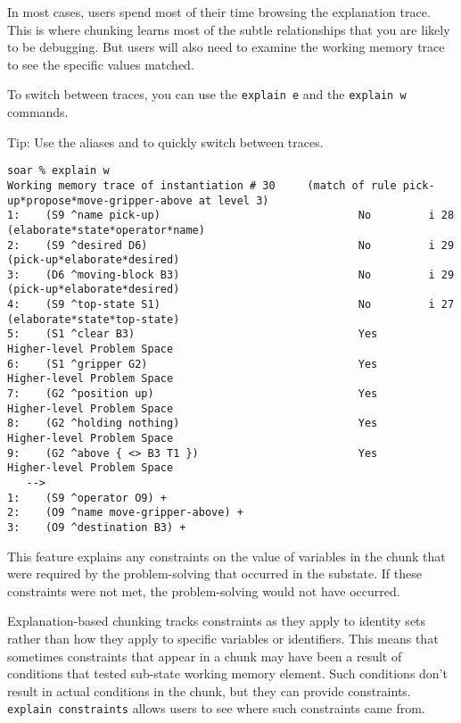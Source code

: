 \textbf{}

In most cases, users spend most of their time browsing the explanation
trace. This is where chunking learns most of the subtle relationships
that you are likely to be debugging. But users will also need to examine
the working memory trace to see the specific values matched.

To switch between traces, you can use the \texttt{explain\ e} and the
\texttt{explain\ w} commands.

Tip: Use the aliases  and  to quickly switch between traces.

{\scriptsize
\begin{verbatim}
soar % explain w
Working memory trace of instantiation # 30     (match of rule pick-up*propose*move-gripper-above at level 3)
1:    (S9 ^name pick-up)                               No         i 28 (elaborate*state*operator*name)
2:    (S9 ^desired D6)                                 No         i 29 (pick-up*elaborate*desired)
3:    (D6 ^moving-block B3)                            No         i 29 (pick-up*elaborate*desired)
4:    (S9 ^top-state S1)                               No         i 27 (elaborate*state*top-state)
5:    (S1 ^clear B3)                                   Yes        Higher-level Problem Space
6:    (S1 ^gripper G2)                                 Yes        Higher-level Problem Space
7:    (G2 ^position up)                                Yes        Higher-level Problem Space
8:    (G2 ^holding nothing)                            Yes        Higher-level Problem Space
9:    (G2 ^above { <> B3 T1 })                         Yes        Higher-level Problem Space
   -->
1:    (S9 ^operator O9) +
2:    (O9 ^name move-gripper-above) +
3:    (O9 ^destination B3) +
\end{verbatim}
}

\textbf{}

This feature explains any constraints on the value of variables in the
chunk that were required by the problem-solving that occurred in the
substate. If these constraints were not met, the problem-solving would
not have occurred.

Explanation-based chunking tracks constraints as they apply to identity
sets rather than how they apply to specific variables or identifiers.
This means that sometimes constraints that appear in a chunk may have
been a result of conditions that tested sub-state working memory
element. Such conditions don't result in actual conditions in the chunk,
but they can provide constraints. \texttt{explain\ constraints} allows
users to see where such constraints came from.

